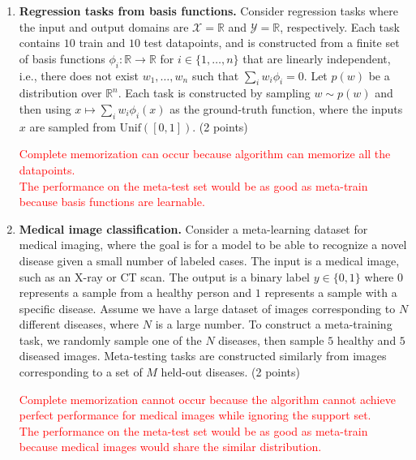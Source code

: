 \documentclass[12pt]{article}
\begin{document}
\begin{enumerate}[label=(\alph*)]
\item \textbf{Regression tasks from basis functions.}
Consider regression tasks where the input and output domains are $\mathcal{X} = \mathbb{R}$ and $\mathcal{Y} = \mathbb{R}$, respectively.
Each task contains $10$ train and $10$ test datapoints, and is constructed from a finite set of basis functions $\phi_i: \mathbb{R} \rightarrow \mathbb{R}$ for $i \in \{1, \ldots, n\}$ that are linearly independent, i.e., there does not exist $w_1, \ldots, w_n$ such that $\sum_i w_i \phi_i = 0$.
Let $p(w)$ be a distribution over $\mathbb{R}^n$. 
Each task is constructed by sampling $w \sim p(w)$ and then using $x \mapsto \sum_i w_i \phi_i(x)$ as the ground-truth function, where the inputs $x$ are sampled from $\textrm{Unif}([0, 1])$.
(2 points)

\textcolor{red}{Complete memorization can occur because algorithm can memorize all the datapoints.\\
The performance on the meta-test set would be as good as meta-train because basis functions are learnable.}

\item \textbf{Medical image classification.}
Consider a meta-learning dataset for medical imaging, where the goal is for a model to be able to recognize a novel disease given a small number of labeled cases.
The input is a medical image, such as an X-ray or CT scan.
The output is a binary label $y \in \{0, 1\}$ where $0$ represents a sample from a healthy person and $1$ represents a sample with a specific disease.
Assume we have a large dataset of images corresponding to $N$ different diseases, where $N$ is a large number.
To construct a meta-training task, we randomly sample one of the $N$ diseases, then sample $5$ healthy and $5$ diseased images.
Meta-testing tasks are constructed similarly from images corresponding to a set of $M$ held-out diseases.
(2 points)

\textcolor{red}{Complete memorization cannot occur because the algorithm cannot achieve perfect performance for medical images while ignoring the support set.\\
The performance on the meta-test set would be as good as meta-train because medical images would share the similar distribution.}


\end{enumerate}
\end{document}
